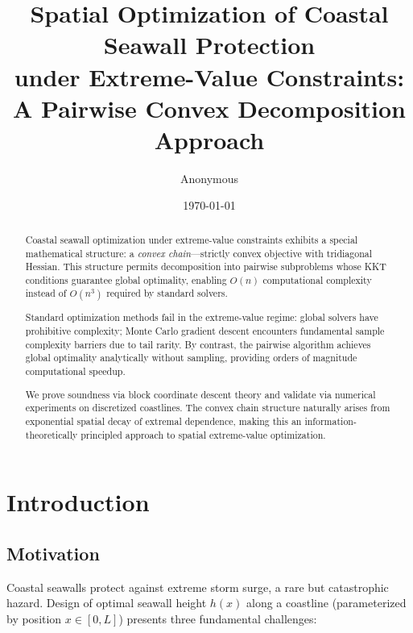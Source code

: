 \documentclass[12pt]{article}
\title{Spatial Optimization of Coastal Seawall Protection \\
under Extreme-Value Constraints: \\
A Pairwise Convex Decomposition Approach}
\author{Anonymous}
\date{\today}
\theoremstyle{definition}
\begin{document}
\maketitle

\begin{abstract}
Coastal seawall optimization under extreme-value constraints exhibits a special mathematical structure: a \emph{convex chain}---strictly convex objective with tridiagonal Hessian. This structure permits decomposition into pairwise subproblems whose KKT conditions guarantee global optimality, enabling $O(n)$ computational complexity instead of $O(n^3)$ required by standard solvers.

Standard optimization methods fail in the extreme-value regime: global solvers have prohibitive complexity; Monte Carlo gradient descent encounters fundamental sample complexity barriers due to tail rarity. By contrast, the pairwise algorithm achieves global optimality analytically without sampling, providing orders of magnitude computational speedup.

We prove soundness via block coordinate descent theory and validate via numerical experiments on discretized coastlines. The convex chain structure naturally arises from exponential spatial decay of extremal dependence, making this an information-theoretically principled approach to spatial extreme-value optimization.
\end{abstract}

\section{Introduction}

\subsection{Motivation}

Coastal seawalls protect against extreme storm surge, a rare but catastrophic hazard. Design of optimal seawall height $h(x)$ along a coastline (parameterized by position $x \in [0,L]$) presents three fundamental challenges:
\end{document}
